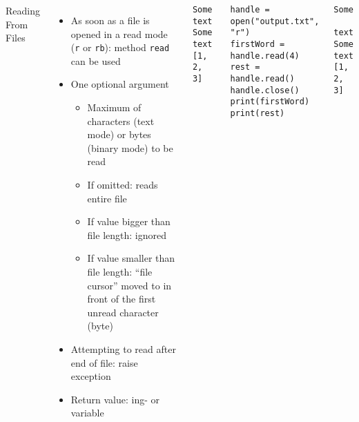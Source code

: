 
\begin{frame}[fragile]
%

\vspace{-12pt}
\begin{columns}[T]

\vspace{12pt}
\begin{Large}
	{Reading From Files}
	\vspace{6pt}
\end{Large}
\begin{itemize}
\item As soon as a file is opened in a read mode (\texttt{r} or \texttt{rb}): method \texttt{read} can be used
\item One optional argument
	\begin{itemize}
	\item Maximum of characters (text mode) or bytes (binary mode) to be read
	\item If omitted: reads entire file
	\item If value bigger than file length: ignored
	\item If value smaller than file length: \enquote{file cursor} moved to in front of the first unread character (byte)
	\end{itemize}
\item Attempting to read after end of file: raise exception
\item Return value: ing- or  variable
\end{itemize}
%
\begin{cmdbox}
\begin{verbatim}
Some text Some text
[1, 2, 3]
\end{verbatim}
\end{cmdbox}
%
\begin{codebox}
\begin{verbatim}
handle = open("output.txt", "r")
firstWord = handle.read(4)
rest = handle.read()
handle.close()
print(firstWord)
print(rest)
\end{verbatim}
\end{codebox}
%
\begin{cmdbox}
\begin{verbatim}
Some
 text Some text
[1, 2, 3]
\end{verbatim}
\end{cmdbox}
%
\end{columns}
%
\end{frame}

